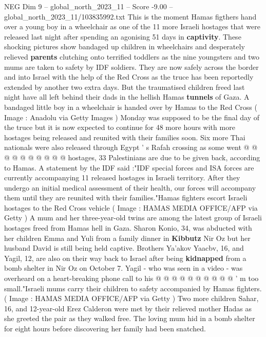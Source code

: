 \begin{textsample}{NEG Dim 9 – global\_north\_2023\_11 – Score -9.00 – global\_north\_2023\_11/103835992.txt}  \label{ex:f9_neg_067}
This is the moment Hamas figthers hand over a young boy in a wheelchair as one of the 11 more Israeli hostages that were released last night after spending an agonising 51 days in \textbf{captivity}.
These shocking pictures show bandaged up children in wheelchairs and desperately relieved \textbf{parents} clutching onto terrified toddlers as the nine youngsters and two mums are taken to safety by IDF soldiers.
They are now safely across the border and into Israel with the help of the Red Cross as the truce has been reportedly extended by another two extra days.
But the traumatised children freed last night have all left behind their dads in the hellish Hamas \textbf{tunnels} of Gaza.
A bandaged little boy in a wheelchair is handed over by Hamas to the Red Cross ( Image : Anadolu via Getty Images ) Monday was supposed to be the final day of the truce but it is now expected to continue for 48 more hours with more hostages being released and reunited with their families soon.
Six more Thai nationals were also released through Egypt ' s Rafah crossing as some went @ @ @ @ @ @ @ @ @ @ hostages, 33 Palestinians are due to be given back, according to Hamas.
A statement by the IDF said :"IDF special forces and ISA forces are currently accompanying 11 released hostages in Israeli territory.
After they undergo an initial medical assessment of their health, our forces will accompany them until they are reunited with their families."Hamas fighters escort Israeli hostages to the Red Cross vehicle ( Image : HAMAS MEDIA OFFICE/AFP via Getty ) A mum and her three-year-old twins are among the latest group of Israeli hostages freed from Hamas hell in Gaza.
Sharon Konio, 34, was abducted with her children Emma and Yuli from a family dinner in \textbf{Kibbutz} Nir Oz but her husband David is still being held captive.
Brothers Ya'akov Yaacbv, 16, and Yagil, 12, are also on their way back to Israel after being \textbf{kidnapped} from a bomb shelter in Nir Oz on October 7.
Yagil - who was seen in a video - was overheard on a heart-breaking phone call to his @ @ @ @ @ @ @ @ @ @ ' m too small."Israeli mums carry their children to safety accompanied by Hamas fighters. ( Image : HAMAS MEDIA OFFICE/AFP via Getty ) Two more children Sahar, 16, and 12-year-old Erez Calderon were met by their relieved mother Hadas as she greeted the pair as they walked free.
The loving mum hid in a bomb shelter for eight hours before discovering her family had been snatched.

\end{textsample}
